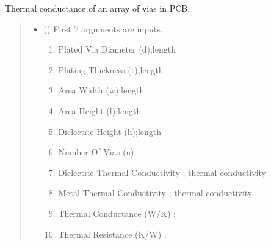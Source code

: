 \documentclass[letterpaper,10pt,english]{sphinxmanual}
\begin{document}

\begin{fulllineitems}
\label{\detokenize{components:components.thermal_conductance_of_via_farm}}
\pysigstartsignatures
{}
\pysigstopsignatures
\sphinxAtStartPar
Thermal conductance of an array of vias in PCB.
\begin{quote}\begin{description}
\begin{itemize}
\item {}
\sphinxAtStartPar
{} () \textendash{}
\sphinxAtStartPar
First 7 arguments are inputs.
\begin{enumerate}
%
\item {}
\sphinxAtStartPar
Plated Via Diameter (d);length

\item {}
\sphinxAtStartPar
Plating Thickness (t);length

\item {}
\sphinxAtStartPar
Area Width (w);length

\item {}
\sphinxAtStartPar
Area Height (l);length

\item {}
\sphinxAtStartPar
Dielectric Height (h);length

\item {}
\sphinxAtStartPar
Number Of Vias (n);

\item {}
\sphinxAtStartPar
Dielectric Thermal Conductivity ;   thermal conductivity

\item {}
\sphinxAtStartPar
Metal Thermal Conductivity ; thermal conductivity

\item {}
\sphinxAtStartPar
Thermal Conductance (W/K) ;

\item {}
\sphinxAtStartPar
Thermal Resistance (K/W) ;

\end{enumerate}



\end{itemize}
\end{description}
\end{quote}
\end{fulllineitems}
\end{document}
